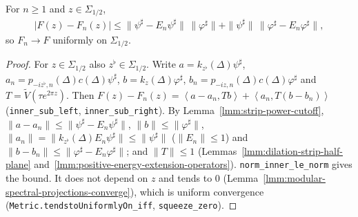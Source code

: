 \begin{lemma}
    \label{lmm:borchers-approximants-uniform}
    \leanok
    For $n \ge 1$ and $z \in \Sigma_{1/2}$,
    \begin{align}
        |F(z) - F_n(z)| \le \|\psi^\sharp - E_n\psi^\sharp\|\,\|\varphi^\sharp\| + \|\psi^\sharp\|\,\|\varphi^\sharp - E_n\varphi^\sharp\|,
    \end{align}
    so $F_n \to F$ uniformly on $\Sigma_{1/2}$.
\end{lemma}
\begin{proof}
    \leanok
    For $z \in \Sigma_{1/2}$ also $z^\flat \in \Sigma_{1/2}$. Write $a = k_{z^\flat}(\Delta)\psi^\sharp$, $a_n = p_{-iz^\flat,n}(\Delta)c(\Delta)\psi^\sharp$, $b = k_z(\Delta)\varphi^\sharp$, $b_n = p_{-iz,n}(\Delta)c(\Delta)\varphi^\sharp$ and $T = \widetilde{V}(\tau e^{2\pi z})$. Then $F(z) - F_n(z) = \left< a - a_n, Tb \right> + \left< a_n, T(b - b_n) \right>$ (\texttt{inner\_sub\_left}, \texttt{inner\_sub\_right}). By Lemma~\ref{lmm:strip-power-cutoff}, $\|a - a_n\| \le \|\psi^\sharp - E_n\psi^\sharp\|$, $\|b\| \le \|\varphi^\sharp\|$, $\|a_n\| = \|k_{z^\flat}(\Delta)E_n\psi^\sharp\| \le \|\psi^\sharp\|$ ($\|E_n\| \le 1$) and $\|b - b_n\| \le \|\varphi^\sharp - E_n\varphi^\sharp\|$; and $\|T\| \le 1$ (Lemmas~\ref{lmm:dilation-strip-half-plane} and~\ref{lmm:positive-energy-extension-operators}). \texttt{norm\_inner\_le\_norm} gives the bound. It does not depend on $z$ and tends to $0$ (Lemma~\ref{lmm:modular-spectral-projections-converge}), which is uniform convergence (\texttt{Metric.tendstoUniformlyOn\_iff}, \texttt{squeeze\_zero}).
\end{proof}

